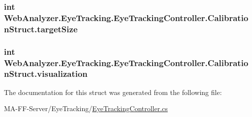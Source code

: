 \subsubsection[{target\+Size}]{\setlength{\rightskip}{0pt plus 5cm}int Web\+Analyzer.\+Eye\+Tracking.\+Eye\+Tracking\+Controller.\+Calibration\+Struct.\+target\+Size}\label{struct_web_analyzer_1_1_eye_tracking_1_1_eye_tracking_controller_1_1_calibration_struct_ad6fba3d6ac1ee64048863c0c45b17ec5}
\hypertarget{struct_web_analyzer_1_1_eye_tracking_1_1_eye_tracking_controller_1_1_calibration_struct_a47dcb619137477583cbb60b468ea86e0}{}
\subsubsection[{visualization}]{\setlength{\rightskip}{0pt plus 5cm}int Web\+Analyzer.\+Eye\+Tracking.\+Eye\+Tracking\+Controller.\+Calibration\+Struct.\+visualization}\label{struct_web_analyzer_1_1_eye_tracking_1_1_eye_tracking_controller_1_1_calibration_struct_a47dcb619137477583cbb60b468ea86e0}


The documentation for this struct was generated from the following file\+:\begin{DoxyCompactItemize}
\item 
M\+A-\/\+F\+F-\/\+Server/\+Eye\+Tracking/\hyperlink{_eye_tracking_controller_8cs}{Eye\+Tracking\+Controller.\+cs}\end{DoxyCompactItemize}
